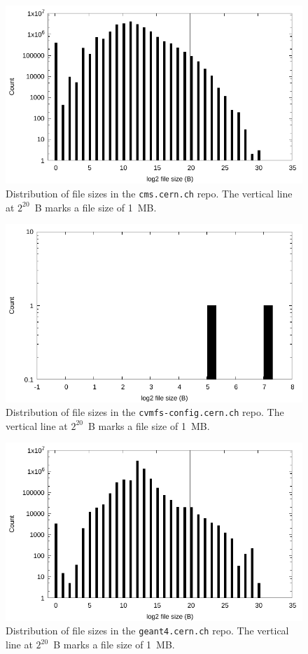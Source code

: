 \documentclass[sigconf]{acmart}
\begin{document}
\begin{figure}
\includegraphics[width=\linewidth]{plots/file-hist/cms.pdf}
\caption{Distribution of file sizes in the \texttt{cms.cern.ch} repo.
The vertical line at $2^{20}$~B marks a file size of 1~MB.}
\end{figure}

\begin{figure}
\includegraphics[width=\linewidth]{plots/file-hist/cvmfs-config.pdf}
\caption{Distribution of file sizes in the \texttt{cvmfs-config.cern.ch} repo.
The vertical line at $2^{20}$~B marks a file size of 1~MB.}
\end{figure}

\begin{figure}
\includegraphics[width=\linewidth]{plots/file-hist/geant4.pdf}
\caption{Distribution of file sizes in the \texttt{geant4.cern.ch} repo.
The vertical line at $2^{20}$~B marks a file size of 1~MB.}
\end{figure}
\end{document}
